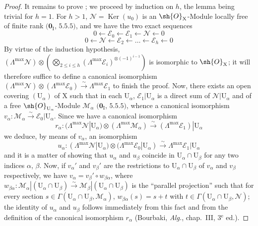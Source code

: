 \begin{proof}
It remains to prove ; we proceed by induction on $h$, the lemma being trivial for $h=1$.
For $h>1$, $\mathscr{N}=\operatorname{Ker}(u_0)$ is an $\sh{O}_{\mathrm{X}}$-Module locally free of finite rank $(\mathbf{0}_{\mathrm{I}}$, $5.5.5)$, and we have the two exact sequences
\[
  0\leftarrow\mathscr{E}_0\leftarrow\mathscr{E}_1\leftarrow\mathscr{N}\leftarrow 0
\]
\[
  0\leftarrow\mathscr{N}\leftarrow\mathscr{E}_2\leftarrow\ldots\leftarrow\mathscr{E}_h\leftarrow 0
\]
By virtue of the induction hypothesis, $(\Lambda^{\max}\mathscr{N})\otimes(\bigotimes_{2\leq i\leq h}(\Lambda^{\max}\mathscr{E}_i)^{\otimes(-1)^{i-1}})$ is isomorphic to $\sh{O}_{\mathrm{X}}$; it will therefore suffice to define a canonical isomorphism $(\Lambda^{\max}\mathscr{N})\otimes(\Lambda^{\max}\mathscr{E}_0)\xrightarrow{\sim}\Lambda^{\max}\mathscr{E}_1$ to finish the proof.
Now, there exists an open covering $(\mathrm{U}_\alpha)$ of $\mathrm{X}$ such that in each $\mathrm{U}_\alpha$, $\mathscr{E}_1|\mathrm{U}_\alpha$ is a direct sum of $\mathscr{N}|\mathrm{U}_\alpha$ and of a free $\sh{O}_{\mathrm{U}_\alpha}$-Module $\mathscr{M}_\alpha$ $(\mathbf{0}_{\mathrm{I}}$, $5.5.5)$, whence a canonical isomorphism $v_\alpha:\mathscr{M}_\alpha\xrightarrow{\sim}\mathscr{E}_0|\mathrm{U}_\alpha$.
Since we have a canonical isomorphism
\[
  r_\alpha:(\Lambda^{\max}\mathscr{N}|\mathrm{U}_\alpha)\otimes(\Lambda^{\max}\mathscr{M}_\alpha)\xrightarrow{\sim}(\Lambda^{\max}\mathscr{E}_1)|\mathrm{U}_\alpha
\]
we deduce, by means of $v_\alpha$, an isomorphism
\[
  u_\alpha:(\Lambda^{\max}\mathscr{N}|\mathrm{U}_\alpha)\otimes(\Lambda^{\max}\mathscr{E}_0|\mathrm{U}_\alpha)\xrightarrow{\sim}\Lambda^{\max}\mathscr{E}_1|\mathrm{U}_\alpha
\]
and it is a matter of showing that $u_\alpha$ and $u_\beta$ coincide in $\mathrm{U}_\alpha\cap\mathrm{U}_\beta$ for any two indices $\alpha$, $\beta$.
Now, if $v_\alpha'$ and $v_\beta'$ are the restrictions to $\mathrm{U}_\alpha\cap\mathrm{U}_\beta$ of $v_\alpha$ and $v_\beta$ respectively, we have $v_\alpha=v_\beta'\circ w_{\beta\alpha}$, where $w_{\beta\alpha}:\mathscr{M}_\alpha|(\mathrm{U}_\alpha\cap\mathrm{U}_\beta)\xrightarrow{\sim}\mathscr{M}_\beta|(\mathrm{U}_\alpha\cap\mathrm{U}_\beta)$ is the ``parallel projection'' such that for every section $s\in\Gamma(\mathrm{U}_\alpha\cap\mathrm{U}_\beta,\mathscr{M}_\alpha)$, $w_{\beta\alpha}(s)=s+t$ with $t\in\Gamma(\mathrm{U}_\alpha\cap\mathrm{U}_\beta,\mathscr{N})$; the identity of $u_\alpha$ and $u_\beta$ follows immediately from this fact and from the definition of the canonical isomorphism $r_\alpha$ (Bourbaki, \emph{Alg.}, chap.~III, 3$^{\text{e}}$ ed.).
\end{proof}

